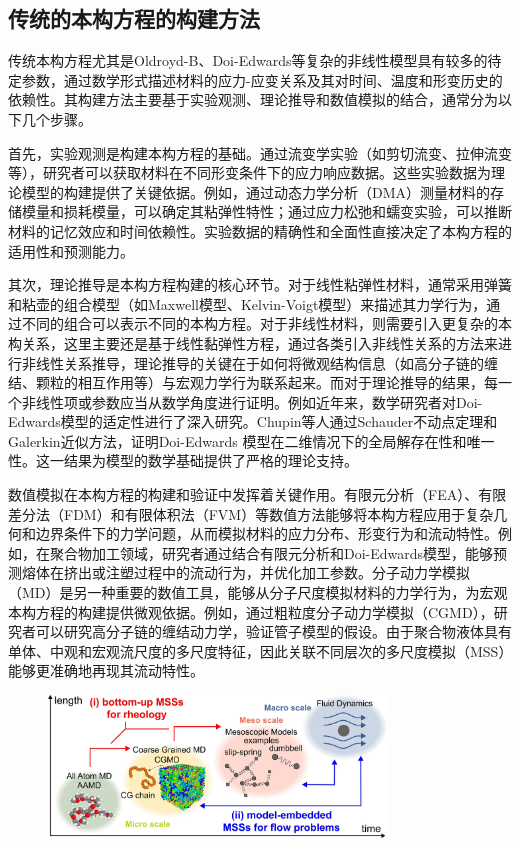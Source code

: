 \subsection{传统的本构方程的构建方法}
传统本构方程尤其是Oldroyd-B、Doi-Edwards等复杂的非线性模型具有较多的待定参数，通过数学形式描述材料的应力-应变关系及其对时间、温度和形变历史的依赖性。其构建方法主要基于实验观测、理论推导和数值模拟的结合，通常分为以下几个步骤。

首先，实验观测是构建本构方程的基础。通过流变学实验（如剪切流变、拉伸流变等），研究者可以获取材料在不同形变条件下的应力响应数据。这些实验数据为理论模型的构建提供了关键依据。例如，通过动态力学分析（DMA）测量材料的存储模量和损耗模量，可以确定其粘弹性特性；通过应力松弛和蠕变实验，可以推断材料的记忆效应和时间依赖性。实验数据的精确性和全面性直接决定了本构方程的适用性和预测能力。

其次，理论推导是本构方程构建的核心环节。对于线性粘弹性材料，通常采用弹簧和粘壶的组合模型（如Maxwell模型、Kelvin-Voigt模型）来描述其力学行为，通过不同的组合可以表示不同的本构方程。对于非线性材料，则需要引入更复杂的本构关系，这里主要还是基于线性黏弹性方程，通过各类引入非线性关系的方法来进行非线性关系推导，理论推导的关键在于如何将微观结构信息（如高分子链的缠结、颗粒的相互作用等）与宏观力学行为联系起来。而对于理论推导的结果，每一个非线性项或参数应当从数学角度进行证明。例如近年来，数学研究者对Doi-Edwards模型的适定性进行了深入研究。Chupin等人通过Schauder不动点定理和Galerkin近似方法，证明Doi-Edwards 模型在二维情况下的全局解存在性和唯一性。这一结果为模型的数学基础提供了严格的理论支持。

数值模拟在本构方程的构建和验证中发挥着关键作用。有限元分析（FEA）、有限差分法（FDM）和有限体积法（FVM）等数值方法能够将本构方程应用于复杂几何和边界条件下的力学问题，从而模拟材料的应力分布、形变行为和流动特性。例如，在聚合物加工领域，研究者通过结合有限元分析和Doi-Edwards模型，能够预测熔体在挤出或注塑过程中的流动行为，并优化加工参数。分子动力学模拟（MD）是另一种重要的数值工具，能够从分子尺度模拟材料的力学行为，为宏观本构方程的构建提供微观依据。例如，通过粗粒度分子动力学模拟（CGMD），研究者可以研究高分子链的缠结动力学，验证管子模型的假设。由于聚合物液体具有单体、中观和宏观流尺度的多尺度特征，因此关联不同层次的多尺度模拟（MSS）能够更准确地再现其流动特性。
\begin{figure}[htbp]
	\centering
	\includegraphics[width=0.8\textwidth]{Fig/duochidumoni.png}
\end{figure}


